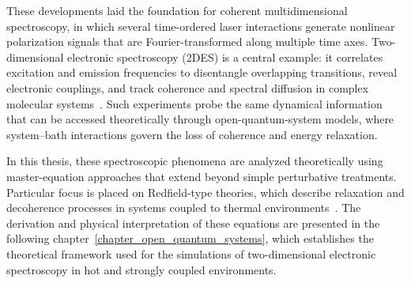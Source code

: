 These developments laid the foundation for coherent multidimensional spectroscopy, in which several time-ordered laser interactions generate nonlinear polarization signals that are Fourier-transformed along multiple time axes.
Two-dimensional electronic spectroscopy (2DES) is a central example: it correlates excitation and emission frequencies to disentangle overlapping transitions, reveal electronic couplings, and track coherence and spectral diffusion in complex molecular systems~\cite{jonas2003twodimensionalfemtosecondspectroscopy, hamm2005principlesnonlinearoptical, cho2009twodimensionalopticalspectroscopy, mukamel1995principlesnonlinearoptical, boyd2008contents}.
Such experiments probe the same dynamical information that can be accessed theoretically through open-quantum-system models, where system–bath interactions govern the loss of coherence and energy relaxation. 

In this thesis, these spectroscopic phenomena are analyzed theoretically using master-equation approaches that extend beyond simple perturbative treatments.
Particular focus is placed on Redfield-type theories, which describe relaxation and decoherence processes in systems coupled to thermal environments~\cite{redfield1957theory, breuer2002theoryopenquantum, may2011quantum}.
The derivation and physical interpretation of these equations are presented in the following chapter~\ref{chapter_open_quantum_systems}, which establishes the theoretical framework used for the simulations of two-dimensional electronic spectroscopy in hot and strongly coupled environments.


